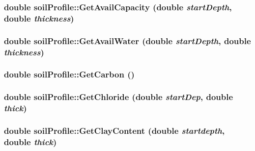 \label{classsoil_profile_a5714479e1a3ca3d9c0669dbdfedf3b57}
\hypertarget{classsoil_profile_adc7003b312a9bcc2fffdd45acfc65f28}{
\subsubsection[{GetAvailCapacity}]{\setlength{\rightskip}{0pt plus 5cm}double soilProfile::GetAvailCapacity (double {\em startDepth}, \/  double {\em thickness})}}
\label{classsoil_profile_adc7003b312a9bcc2fffdd45acfc65f28}
\hypertarget{classsoil_profile_a51f57a7397df5853e8899f34ada2d374}{
\subsubsection[{GetAvailWater}]{\setlength{\rightskip}{0pt plus 5cm}double soilProfile::GetAvailWater (double {\em startDepth}, \/  double {\em thickness})}}
\label{classsoil_profile_a51f57a7397df5853e8899f34ada2d374}
\hypertarget{classsoil_profile_afb39b89d67044da69b0258915c5eed1e}{
\subsubsection[{GetCarbon}]{\setlength{\rightskip}{0pt plus 5cm}double soilProfile::GetCarbon ()}}
\label{classsoil_profile_afb39b89d67044da69b0258915c5eed1e}
\hypertarget{classsoil_profile_a51f252742a43f831953d0ea34e273530}{
\subsubsection[{GetChloride}]{\setlength{\rightskip}{0pt plus 5cm}double soilProfile::GetChloride (double {\em startDep}, \/  double {\em thick})}}
\label{classsoil_profile_a51f252742a43f831953d0ea34e273530}
\hypertarget{classsoil_profile_a27959c28ab4031f581b0e17142a45b7f}{
\subsubsection[{GetClayContent}]{\setlength{\rightskip}{0pt plus 5cm}double soilProfile::GetClayContent (double {\em startdepth}, \/  double {\em thick})}}
